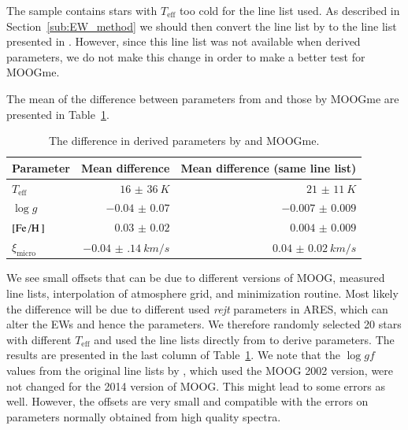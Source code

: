 \documentclass{aa}
\begin{document}
The sample contains stars with $T_\mathrm{eff}$ too cold for the line
list used. As described in Section~\ref{sub:EW_method} we should then
convert the line list by \citet{Sousa2008a} to the line list presented
in \citet{Tsantaki2013}. However, since this line list was not available
when \citet{Sousa2011} derived parameters, we do not make this change
in order to make a better test for MOOGme.

The mean of the difference between parameters from \citet{Sousa2011} and
those by MOOGme are presented in Table~\ref{tab:MOOGmeTest}.

\begin{table}[htb!]
    \caption{The difference in derived parameters by \citet{Sousa2011}
    and MOOGme.}
    \label{tab:MOOGmeTest}
    \centering
    \begin{tabular}{lrr}
      \hline\hline
      Parameter             &  Mean difference         & Mean difference (same line list) \\
      \hline
      $T_\mathrm{eff}$      &  $\SI{16(36)}{K}$        & $\SI{21(11)}{K}$                 \\
      $\log g$              &  $\num{-0.04(7)}$        & $\num{-0.007(9)}$                \\
      $[\ion{Fe}/\ion{H}]$  &  $\num{0.03(2)}$         & $\num{0.004(9)}$                 \\
      $\xi_\mathrm{micro}$  &  $\SI{-0.04(14)}{km/s}$  & $\SI{0.04(2)}{km/s}$             \\
      \hline
    \end{tabular}
\end{table}

We see small offsets that can be due to different versions of MOOG, measured
line lists, interpolation of atmosphere grid, and minimization routine. Most
likely the difference will be due to different used \emph{rejt} parameters
in ARES, which can alter the EWs and hence the parameters. We therefore randomly
selected 20 stars with different $T_\mathrm{eff}$ and used the line lists
directly from \citet{Sousa2011} to derive parameters. The results are
presented in the last column of Table~\ref{tab:MOOGmeTest}. We note that
the $\log gf$ values from the original line lists by \citet{Sousa2011}, which
used the MOOG 2002 version, were not changed for the 2014 version of MOOG.
This might lead to some errors as well. However, the offsets are very small
and compatible with the errors on parameters normally obtained from high
quality spectra.
\end{document}
